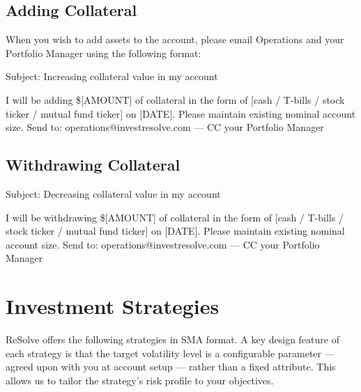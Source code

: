 \documentclass{resolve-whitepaper}
\begin{document}
\subsection{Adding Collateral}\label{adding-collateral}

When you wish to add assets to the account, please email Operations and
your Portfolio Manager using the following format:

\begin{callout}

Subject: Increasing collateral value in my account

\end{callout}

I will be adding \${[}AMOUNT{]} of collateral in the form of {[}cash /
T-bills / stock ticker / mutual fund ticker{]} on {[}DATE{]}. Please
maintain existing nominal account size. Send to:
operations@investresolve.com --- CC your Portfolio Manager

\begin{callout}

\end{callout}

\subsection{Withdrawing Collateral}\label{withdrawing-collateral}

\begin{callout}

Subject: Decreasing collateral value in my account

\end{callout}

I will be withdrawing \${[}AMOUNT{]} of collateral in the form of
{[}cash / T-bills / stock ticker / mutual fund ticker{]} on {[}DATE{]}.
Please maintain existing nominal account size. Send to:
operations@investresolve.com --- CC your Portfolio Manager

\begin{callout}

\end{callout}

\section{Investment Strategies}\label{investment-strategies}

ReSolve offers the following strategies in SMA format. A key design
feature of each strategy is that the target volatility level is a
configurable parameter --- agreed upon with you at account setup ---
rather than a fixed attribute. This allows us to tailor the strategy's
risk profile to your objectives.
\end{document}
